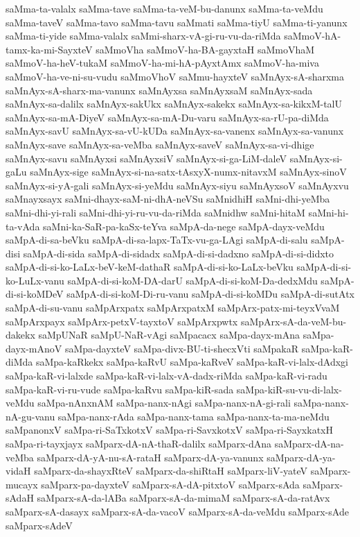 {saMma-ta-valalx
saMma-tave
saMma-ta-veM-bu-danunx
saMma-ta-veMdu
saMma-taveV
saMma-tavo
saMma-tavu
saMmati
saMma-tiyU
saMma-ti-yanunx
saMma-ti-yide
saMma-valalx
saMmi-sharx-vA-gi-ru-vu-da-riMda
saMmoV-hA-tamx-ka-mi-SayxteV
saMmoVha
saMmoV-ha-BA-gayxtaH
saMmoVhaM
saMmoV-ha-heV-tukaM
saMmoV-ha-mi-hA-pAyxtAmx
saMmoV-ha-miva
saMmoV-ha-ve-ni-su-vudu
saMmoVhoV
saMmu-hayxteV
saMnAyx-sA-sharxma
saMnAyx-sA-sharx-ma-vanunx
saMnAyxsa
saMnAyxsaM
saMnAyx-sada
saMnAyx-sa-dalilx
saMnAyx-sakUkx
saMnAyx-sakekx
saMnAyx-sa-kikxM-talU
saMnAyx-sa-mA-DiyeV
saMnAyx-sa-mA-Du-varu
saMnAyx-sa-rU-pa-diMda
saMnAyx-savU
saMnAyx-sa-vU-kUDa
saMnAyx-sa-vanenx
saMnAyx-sa-vanunx
saMnAyx-save
saMnAyx-sa-veMba
saMnAyx-saveV
saMnAyx-sa-vi-dhige
saMnAyx-savu
saMnAyxsi
saMnAyxsiV
saMnAyx-si-ga-LiM-daleV
saMnAyx-si-gaLu
saMnAyx-sige
saMnAyx-si-na-satx-tAsxyX-numx-nitavxM
saMnAyx-sinoV
saMnAyx-si-yA-gali
saMnAyx-si-yeMdu
saMnAyx-siyu
saMnAyxsoV
saMnAyxvu
saMnayxsayx
saMni-dhayx-saM-ni-dhA-neVSu
saMnidhiH
saMni-dhi-yeMba
saMni-dhi-yi-rali
saMni-dhi-yi-ru-vu-da-riMda
saMnidhw
saMni-hitaM
saMni-hi-ta-vAda
saMni-ka-SaR-pa-kaSx-teYva
saMpA-da-nege
saMpA-dayx-veMdu
saMpA-di-sa-beVku
saMpA-di-sa-lapx-TaTx-vu-ga-LAgi
saMpA-di-salu
saMpA-disi
saMpA-di-sida
saMpA-di-sidadx
saMpA-di-si-dadxno
saMpA-di-si-didxto
saMpA-di-si-ko-LaLx-beV-keM-dathaR
saMpA-di-si-ko-LaLx-beVku
saMpA-di-si-ko-LuLx-vanu
saMpA-di-si-koM-DA-darU
saMpA-di-si-koM-Da-dedxMdu
saMpA-di-si-koMDeV
saMpA-di-si-koM-Di-ru-vanu
saMpA-di-si-koMDu
saMpA-di-sutAtx
saMpA-di-su-vanu
saMpArxpatx
saMpArxpatxM
saMpArx-patx-mi-teyxVvaM
saMpArxpayx
saMpArx-petxV-tayxtoV
saMpArxpwtx
saMpArx-sA-da-veM-bu-dakekx
saMpUNaR
saMpU-NaR-vAgi
saMpacacx
saMpa-dayx-mAna
saMpa-dayx-mAnoV
saMpa-dayxteV
saMpa-divx-BU-ti-shecxVti
saMpakaR
saMpa-kaR-diMda
saMpa-kaRkekx
saMpa-kaRvU
saMpa-kaRveV
saMpa-kaR-vi-lalx-dAdxgi
saMpa-kaR-vi-lalxde
saMpa-kaR-vi-lalx-vA-dadx-riMda
saMpa-kaR-vi-radu
saMpa-kaR-vi-ru-vude
saMpa-kaRvu
saMpa-kiR-sada
saMpa-kiR-su-vu-di-lalx-veMdu
saMpa-nAnxnAM
saMpa-nanx-nAgi
saMpa-nanx-nA-gi-rali
saMpa-nanx-nA-gu-vanu
saMpa-nanx-rAda
saMpa-nanx-tama
saMpa-nanx-ta-ma-neMdu
saMpanonxV
saMpa-ri-SaTxkotxV
saMpa-ri-SavxkotxV
saMpa-ri-SayxkatxH
saMpa-ri-tayxjayx
saMparx-dA-nA-thaR-dalilx
saMparx-dAna
saMparx-dA-na-veMba
saMparx-dA-yA-nu-sA-rataH
saMparx-dA-ya-vanunx
saMparx-dA-ya-vidaH
saMparx-da-shayxRteV
saMparx-da-shiRtaH
saMparx-liV-yateV
saMparx-mucayx
saMparx-pa-dayxteV
saMparx-sA-dA-pitxtoV
saMparx-sAda
saMparx-sAdaH
saMparx-sA-da-lABa
saMparx-sA-da-mimaM
saMparx-sA-da-ratAvx
saMparx-sA-dasayx
saMparx-sA-da-vacoV
saMparx-sA-da-veMdu
saMparx-sAde
saMparx-sAdeV
}
